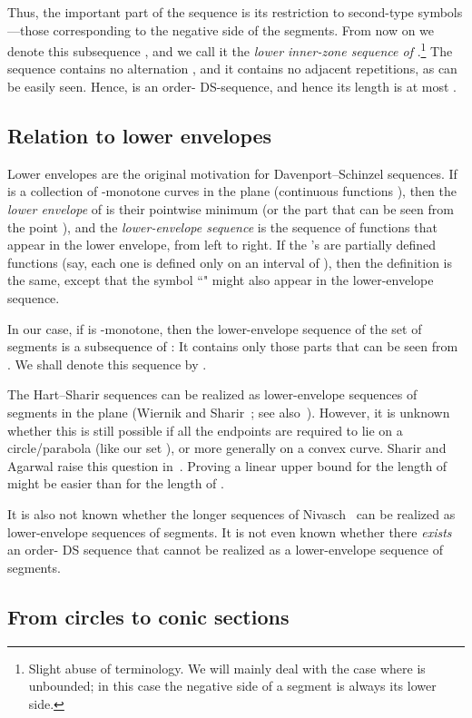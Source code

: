 \documentclass[11pt]{article}
\theoremstyle{definition}
\theoremstyle{remark}
\begin{document}
Thus, the important part of the sequence  is its restriction to second-type symbols---those corresponding to the negative side of the segments. From now on we denote this subsequence , and we call it the \emph{lower inner-zone sequence of }.\footnote{Slight abuse of terminology. We will mainly deal with the case where  is unbounded; in this case the negative side of a segment is always its lower side.} The sequence  contains no alternation , and it contains no adjacent repetitions, as can be easily seen. Hence,  is an order- DS-sequence, and hence its length is at most .

\subsection{Relation to lower envelopes}

Lower envelopes are the original motivation for Davenport--Schinzel sequences. If  is a collection of  -monotone curves in the plane (continuous functions ), then the \emph{lower envelope} of  is their pointwise minimum (or the part that can be seen from the point ), and the \emph{lower-envelope sequence} is the sequence of functions that appear in the lower envelope, from left to right. If the 's are partially defined functions (say, each one is defined only on an interval of ), then the definition is the same, except that the symbol ``" might also appear in the lower-envelope sequence.

In our case, if  is -monotone, then the lower-envelope sequence of the set of segments  is a subsequence of : It contains only those parts that can be seen from . We shall denote this sequence by .

The Hart--Sharir sequences can be realized as lower-envelope sequences of segments in the plane (Wiernik and Sharir~\cite{WS}; see also~\cite{mat_DG, DS_book}). However, it is unknown whether this is still possible if all the endpoints are required to lie on a circle/parabola (like our set ), or more generally on a convex curve. Sharir and Agarwal raise this question in~\cite[p.~112]{DS_book}. Proving a linear upper bound for the length of  might be easier than for the length of .

It is also not known whether the longer sequences of Nivasch~\cite{yo_DS} can be realized as lower-envelope sequences of segments. It is not even known whether there \emph{exists} an order- DS sequence that cannot be realized as a lower-envelope sequence of segments.

\subsection{From circles to conic sections}\label{subsec_conic}
\end{document}
